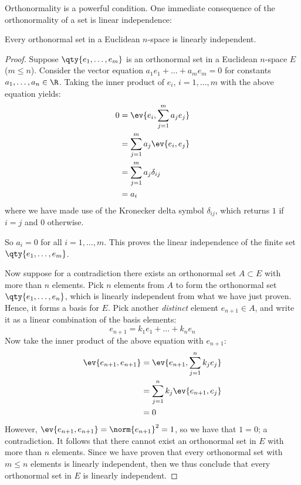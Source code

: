 Orthonormality is a powerful condition. One immediate consequence of the orthonormality of a set is linear independence:
\begin{proposition}
  Every orthonormal set in a Euclidean \( n \)-space is linearly independent.
\end{proposition}
\begin{proof}
  Suppose \( \qty{e_1,\dots,e_m} \) is an orthonormal set in a Euclidean \( n \)-space \( E \) (\( m\leq n \)). Consider the vector equation \( a_1e_1+\dots+a_me_m=0 \) for constants \( a_1,\dots,a_n\in\R \). Taking the inner product of \( e_i \), \( i=1,\dots,m \) with the above equation yields:
  \begin{align*}
    0&= \ev{e_i,\sum_{j=1}^ma_je_j}\\
    &=\sum_{j=1}^ma_j\ev{e_i,e_j}\\
    &= \sum_{j=1}^ma_j\delta_{ij}\\
    &= a_i
  \end{align*}
  where we have made use of the Kronecker delta symbol \( \delta_{ij} \), which returns \( 1 \) if \( i=j \) and 0 otherwise.

  \vspace{3mm}

  
  So \( a_i=0 \) for all \( i=1,\dots, m \). This proves the linear independence of the finite set \( \qty{e_1,\dots,e_m} \).

  \vspace{3mm}

  Now suppose for a contradiction there exists an orthonormal set \( A\subset E \) with more than \( n \) elements. Pick \( n \) elements from \( A \) to form the orthonormal set \( \qty{e_1,\dots,e_n} \), which is linearly independent from what we have just proven. Hence, it forms a basis for \( E \). Pick another \emph{distinct} element \( e_{n+1}\in A \), and write it as a linear combination of the basis elements:
  \[ e_{n+1}=k_1e_1+\dots+k_ne_n \]
  Now take the inner product of the above equation with \( e_{n+1} \):
  \begin{align*}
    \ev{e_{n+1},e_{n+1}}&= \ev{e_{n+1},\sum_{j=1}^nk_je_j}\\
    &= \sum_{j=1}^nk_j\ev{e_{n+1},e_j}\\
    &= 0
  \end{align*}
  However, \( \ev{e_{n+1},e_{n+1}}=\norm{e_{n+1}}^2=1 \), so we have that \( 1=0 \); a contradiction. It follows that there cannot exist an orthonormal set in \( E \) with more than \( n \) elements. Since we have proven that every orthonormal set with \( m\leq n \) elements is linearly independent, then we thus conclude that every orthonormal set in \( E \) is linearly independent.
\end{proof}

